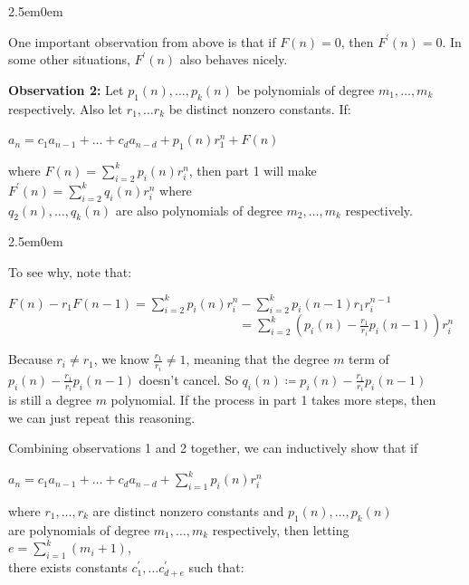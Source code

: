 \documentclass{book}
\newcommand{\exPP}{%
   \color{RedViolet}%
   \fontsize{12}{14}\selectfont%
}
\newenvironment{myIndent}{%
   \begin{adjustwidth}{2.5em}{0em}%
}{%
   \end{adjustwidth}%
}
\newcommand{\blab}[1]{\textbf{#1}}
\newcommand{\retTwo}{\hfill\bigbreak}
\begin{document}
\begin{myIndent}
   One important observation from above is that if $F(n) = 0$, then $F^\prime(n) = 0$. In some other situations, $F^\prime(n)$ also behaves nicely.\retTwo

   \blab{Observation 2:} Let $p_1(n), \ldots, p_k(n)$ be polynomials of degree $m_1, \ldots, m_k$ respectively. Also let $r_1, \ldots r_k$ be distinct nonzero constants. If:
   
   {\centering $a_n = c_1a_{n-1} + \ldots + c_da_{n-d} + p_1(n)r_1^n + F(n)$\\ \par}

   where $F(n) = \sum\limits_{i=2}^k p_i(n)r_i^n$, then part 1 will make  $F^\prime(n) = \sum\limits_{i = 2}^k q_i(n)r_i^n$ where\\ $q_2(n), \ldots, q_k(n)$ are also polynomials of degree $m_2, \ldots, m_k$ respectively.\\ [-6pt]

   \begin{myIndent}\exPP
      To see why, note that:
      
      {\centering $F(n) - r_1F(n -1) = \sum\limits_{i =2}^k p_i(n)r_i^n - \sum\limits_{i = 2}^k p_i(n - 1)r_1r_i^{n-1}$ \\
      $\phantom{F(n) - r_1F(n -1) = \sum\limits_{i =2}^k p_i(n)r_i^n} = \sum\limits_{i = 2}^k (p_i(n) - \frac{r_1}{r_i}p_i(n - 1))r_i^n$ \newpage\par}

      Because $r_i \neq r_1$, we know $\frac{r_1}{r_i} \neq 1$, meaning that the degree $m$ term of\\ $p_i(n) - \frac{r_1}{r_i}p_i(n - 1)$ doesn't cancel. So $q_i(n) \coloneq p_i(n) - \frac{r_1}{r_i}p_i(n - 1)$\\ is still a degree $m$ polynomial. If the process in part 1 takes more steps, then\\ we can just repeat this reasoning.\\ [6pt]
   \end{myIndent}

   Combining observations 1 and 2 together, we can inductively show that if
   
   {\centering $a_n = c_1a_{n-1} + \ldots + c_da_{n-d} + \sum\limits_{i = 1}^k p_i(n)r_i^n$\par}

   where $r_1, \ldots, r_k$ are distinct nonzero constants and $p_1(n), \ldots, p_k(n)$\\ [-6pt] are polynomials of degree $m_1, \ldots, m_k$ respectively, then letting $e = \sum\limits_{i=1}^k(m_i + 1)$,\\ [-6pt] there exists constants $c_1^\prime, \ldots c_{d + e}^\prime$ such that:


\end{myIndent}
\end{document}
